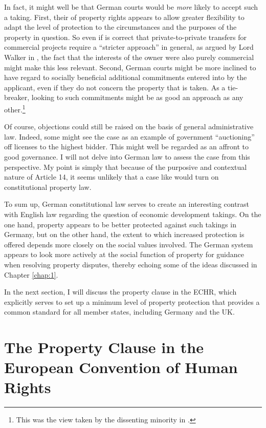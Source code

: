 {In fact, it might well be that German courts would be {\it more} likely to accept such a taking. First, their  of property rights appears to allow greater flexibility to adapt the level of protection to the circumstances and the purposes of the property in question. So even if is correct that private-to-private transfers for commercial projects require a ``stricter approach'' in general, as argued by Lord Walker in \textcite{sainsbury10}, the fact that the interests of the owner were also purely commercial  might make this less relevant. Second, German courts might be more inclined to have regard to socially beneficial additional commitments entered into by the applicant, even if they do not concern the property that is taken. As a tie-breaker, looking to such commitments might be as good an approach as any other.\footnote{This was the view taken by the dissenting minority in \textcite{sainsbury10}.}

Of course, objections could still be raised on the basis of general administrative law. Indeed, some might see the case as an example of government ``auctioning'' off licenses to the highest bidder. This might well be regarded as an affront to good governance. I will not delve into German law to assess the case from this perspective. My point is simply that because of the purposive and contextual nature of Article 14, it seems unlikely that a case like \textcite{sainsbury10} would turn on constitutional property law.

To sum up, German constitutional law serves to create an interesting contrast with English law regarding the question of economic development takings. On the one hand, property appears to be better protected against such takings in Germany, but on the other hand, the extent to which increased protection is offered depends more closely on the social values involved. The German system appears to look more actively at the social function of property for guidance when resolving property disputes, thereby echoing some of the ideas discussed in Chapter \ref{chap:1}. 

In the next section, I will discuss the property clause in the ECHR, which explicitly serves to set up a minimum level of property protection that provides a common standard for all member states, including Germany and the UK.
}

\section{The Property Clause in the European Convention of Human Rights}\label{sec:echr}

